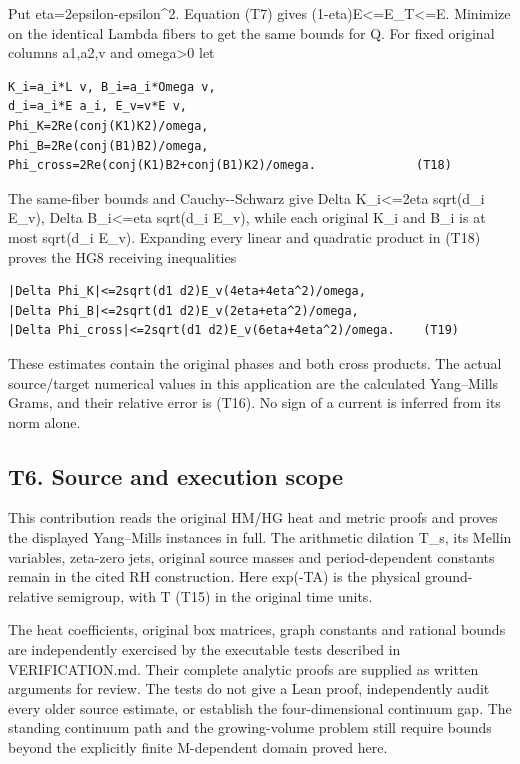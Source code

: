 \documentclass[11pt,a4paper]{article}
\renewcommand{\[}{\begingroup\small\originaldisplaystart}
\renewcommand{\]}{\originaldisplayend\endgroup}
\begin{document}
Put eta=2epsilon-epsilon\^{}2. Equation (T7) gives
(1-eta)E\textless=E\_T\textless=E. Minimize on the identical Lambda
fibers to get the same bounds for Q. For fixed original columns a1,a2,v
and omega\textgreater0 let

\begin{verbatim}
K_i=a_i*L v, B_i=a_i*Omega v,
d_i=a_i*E a_i, E_v=v*E v,
Phi_K=2Re(conj(K1)K2)/omega,
Phi_B=2Re(conj(B1)B2)/omega,
Phi_cross=2Re(conj(K1)B2+conj(B1)K2)/omega.              (T18)
\end{verbatim}

The same-fiber bounds and Cauchy-\/-Schwarz give \textbar Delta
K\_i\textbar\textless=2eta sqrt(d\_i E\_v), \textbar Delta
B\_i\textbar\textless=eta sqrt(d\_i E\_v), while each original
\textbar K\_i\textbar{} and \textbar B\_i\textbar{} is at most sqrt(d\_i
E\_v). Expanding every linear and quadratic product in (T18) proves the
HG8 receiving inequalities

\begin{verbatim}
|Delta Phi_K|<=2sqrt(d1 d2)E_v(4eta+4eta^2)/omega,
|Delta Phi_B|<=2sqrt(d1 d2)E_v(2eta+eta^2)/omega,
|Delta Phi_cross|<=2sqrt(d1 d2)E_v(6eta+4eta^2)/omega.    (T19)
\end{verbatim}

These estimates contain the original phases and both cross products. The
actual source/target numerical values in this application are the
calculated Yang--Mills Grams, and their relative error is (T16). No sign
of a current is inferred from its norm alone.

\subsection{T6. Source and execution
scope}\label{t6.-source-and-execution-scope}

This contribution reads the original HM/HG heat and metric proofs and
proves the displayed Yang--Mills instances in full. The arithmetic
dilation T\_s, its Mellin variables, zeta-zero jets, original source
masses and period-dependent constants remain in the cited RH
construction. Here exp(-TA) is the physical ground-relative semigroup,
with T (T15) in the original time units.

The heat coefficients, original box matrices, graph constants and
rational bounds are independently exercised by the executable tests
described in VERIFICATION.md. Their complete analytic proofs are
supplied as written arguments for review. The tests do not give a Lean
proof, independently audit every older source estimate, or establish the
four-dimensional continuum gap. The standing continuum path and the
growing-volume problem still require bounds beyond the explicitly finite
M-dependent domain proved here.
\end{document}
